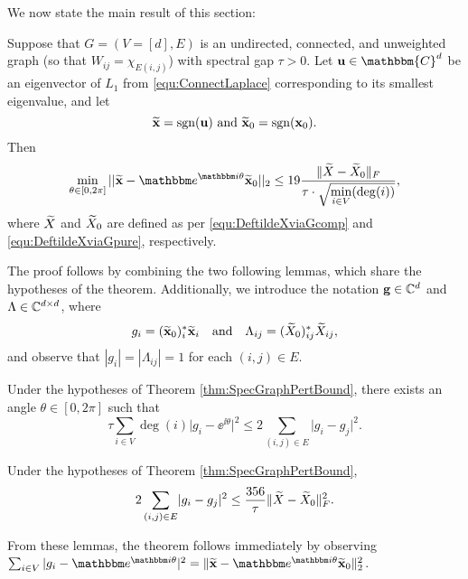 We now state the main result of this section:

\begin{theorem}
Suppose that $G = (V=[d], E)$ is an undirected, connected, and unweighted graph (so that $W_{ij} = \chi_{E(i, j)}$) with spectral gap $\tau > 0$.  Let ${\bf u} \in \mathbbm{C}^d$ be an eigenvector of $L_1$ from \eqref{equ:ConnectLaplace} corresponding to its smallest eigenvalue, and let \[\widetilde{\bf x} = \sgn({\bf u}) \ \text{and} \ \tx_0 = \sgn(\x_0).\] Then \[\min_{\theta \in [0, 2\pi]} ||\tx - \ee^{\ii \theta} \tx_0||_2 \le 19 \bigfrac{\|\tX - \widetilde{\X}_0\|_F}{\tau \cdot \sqrt{\min_{i \in V}(\deg(i))}},\] where $\widetilde{X}$ and $\widetilde{X}_0$ are defined as per \eqref{equ:DeftildeXviaGcomp} and \eqref{equ:DeftildeXviaGpure}, respectively. %
\label{thm:SpecGraphPertBound}
\end{theorem}

The proof follows by combining the two following lemmas, which share the hypotheses of the theorem.  Additionally, we introduce the notation ${\bf g} \in \mathbb{C}^d$ and $\Lambda \in \mathbb{C}^{d \times d}$, where $$g_i = (\widetilde{\mathbf x}_0)^*_i \widetilde{\mathbf x}_i \quad \text{and} \quad \Lambda_{ij} = (\widetilde{X}_0)^*_{ij} \widetilde{X}_{ij},$$ and observe that $|g_i| = |\Lambda_{ij}| = 1$ for each $(i, j) \in E$.

\begin{lemma}
Under the hypotheses of Theorem \ref{thm:SpecGraphPertBound}, there exists an angle $\theta \in [0, 2\pi]$ such that \[\tau \sum_{i \in V} \deg(i) \lvert g_i - \ee^{\ii \theta} \rvert^2 \le 2 \sum_{(i, j) \in E} \lvert g_i - g_j \rvert^2.\]
\label{lem:gbound1}
\end{lemma}

\begin{lemma}
Under the hypotheses of Theorem \ref{thm:SpecGraphPertBound}, \[2\sum_{(i, j) \in E} \lvert g_i - g_j \rvert^2 \le \dfrac{356}{\tau} \lVert \widetilde{X} - \widetilde{X}_0 \rVert^2_F.\]
\label{lem:gbound2}
\end{lemma}

From these lemmas, the theorem follows immediately by observing $\sum_{i \in V} |g_i - \ee^{\ii \theta}|^2 = \norm{\tx - \ee^{\ii \theta} \tx_0}_2^2$.

